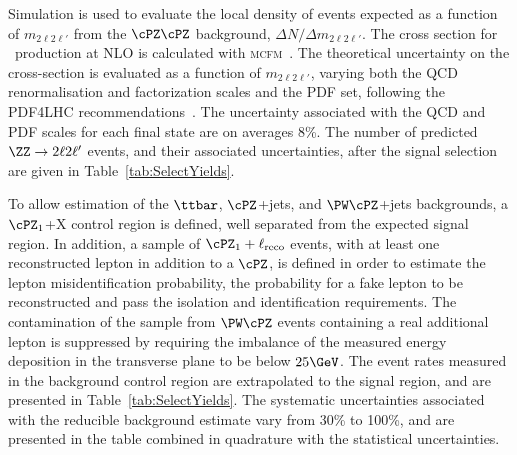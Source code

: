 Simulation is used to evaluate the local density of events expected as a function of $m_{2\ell2\ell'}$ from the
$\cPZ\cPZ$ background, $\Delta N / \Delta m_{2\ell2\ell'}$. The cross section for \ZZ\ production at NLO is
calculated with \textsc{mcfm}~\cite{MCFM,Campbell:1999ah,Campbell:2011bn}. The theoretical uncertainty on the
cross-section is evaluated as a function of $m_{2\ell2\ell'}$, varying both the QCD renormalisation and factorization
scales and the PDF set, following the PDF4LHC recommendations~\cite{Botje:2011sn,Alekhin:2011sk,Lai:2010vv,Martin:2009iq,Ball:2011mu}. The uncertainty associated
with the QCD and PDF scales for each final state are on averages 8\%. The number of predicted $\ZZ \to 2\ell 2\ell'$
events, and their associated uncertainties, after the signal selection are given in Table~\ref{tab:SelectYields}.


To allow estimation of the $\ttbar$, $\cPZ$+jets, and $\PW\cPZ$+jets backgrounds, a $\cPZ_1$+X control region 
is
defined, 
well separated from the expected signal region.
In addition, a sample of $\cPZ_1 + \ell_\text{reco}$ events, with at least 
one reconstructed lepton in addition to a $\cPZ$, is
defined in order to estimate the lepton misidentification probability, the probability for a fake lepton to be reconstructed and pass the isolation and identification requirements. The contamination of the sample from $\PW\cPZ$ events containing a
real additional lepton is suppressed by requiring the imbalance of the measured energy deposition in the transverse
plane to be below $25\GeV$. The event rates measured in the background control region are extrapolated to the
signal region, and are presented in Table~\ref{tab:SelectYields}. The systematic uncertainties associated with the 
reducible background estimate vary from 30\% to 100\%, and are presented in the table combined in quadrature with
the statistical uncertainties.




